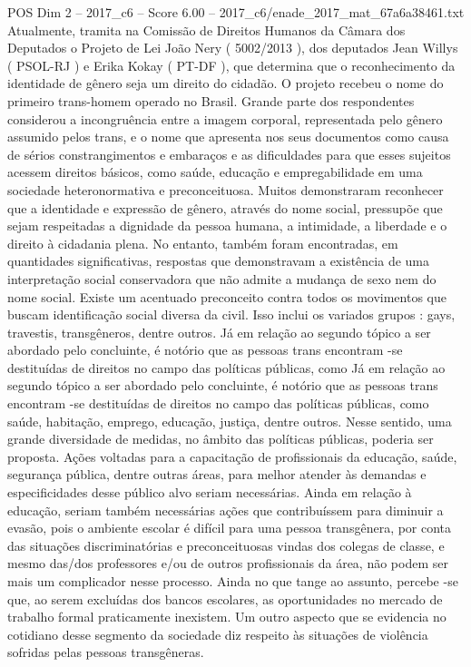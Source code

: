 \begin{textsample}{POS Dim 2 – 2017\_c6 – Score 6.00 – 2017\_c6/enade\_2017\_mat\_67a6a38461.txt}
Atualmente, tramita na Comissão de Direitos Humanos da Câmara dos Deputados o Projeto de Lei João Nery ( 5002/2013 ), dos deputados Jean Willys ( PSOL-RJ ) e Erika Kokay ( PT-DF ), que determina que o reconhecimento da identidade de gênero seja um direito do cidadão.
O projeto recebeu o nome do primeiro trans-homem operado no Brasil.
Grande parte dos respondentes considerou a incongruência entre a imagem corporal, representada pelo gênero assumido pelos trans, e o nome que apresenta nos seus documentos como causa de sérios constrangimentos e embaraços e as dificuldades para que esses sujeitos acessem direitos básicos, como saúde, educação e empregabilidade em uma sociedade heteronormativa e preconceituosa.
Muitos demonstraram reconhecer que a identidade e expressão de gênero, através do nome social, pressupõe que sejam respeitadas a dignidade da pessoa humana, a intimidade, a liberdade e o direito à cidadania plena.
No entanto, também foram encontradas, em quantidades significativas, respostas que demonstravam a existência de uma interpretação social conservadora que não admite a mudança de sexo nem do nome social.
Existe um acentuado preconceito contra todos os movimentos que buscam identificação social diversa da civil.
Isso inclui os variados grupos : gays, travestis, transgêneros, dentre outros.
Já em relação ao segundo tópico a ser abordado pelo concluinte, é notório que as pessoas trans encontram -se destituídas de direitos no campo das políticas públicas, como Já em relação ao segundo tópico a ser abordado pelo concluinte, é notório que as pessoas trans encontram -se destituídas de direitos no campo das políticas públicas, como saúde, habitação, emprego, educação, justiça, dentre outros.
Nesse sentido, uma grande diversidade de medidas, no âmbito das políticas públicas, poderia ser proposta.
Ações voltadas para a capacitação de profissionais da educação, saúde, segurança pública, dentre outras áreas, para melhor atender às demandas e especificidades desse público alvo seriam necessárias.
Ainda em relação à educação, seriam também necessárias ações que contribuíssem para diminuir a evasão, pois o ambiente escolar é difícil para uma pessoa transgênera, por conta das situações discriminatórias e preconceituosas vindas dos colegas de classe, e mesmo das/dos professores e/ou de outros profissionais da área, não podem ser mais um complicador nesse processo.
Ainda no que tange ao assunto, percebe -se que, ao serem excluídas dos bancos escolares, as oportunidades no mercado de trabalho formal praticamente inexistem.
Um outro aspecto que se evidencia no cotidiano desse segmento da sociedade diz respeito às situações de violência sofridas pelas pessoas transgêneras.

\end{textsample}
